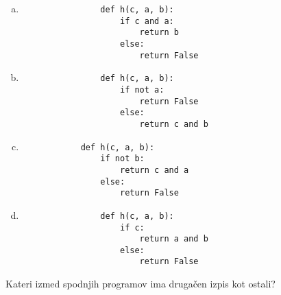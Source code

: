 \documentclass[arhiv, 10pt]{../izpit}
\begin{document}
        \begin{multicols}{2}
        \begin{enumerate}[(a)]
\item 
                \begin{verbatim}
                def h(c, a, b):
                    if c and a:
                        return b
                    else:
                        return False
                \end{verbatim}
            
\item 
                \begin{verbatim}
                def h(c, a, b):
                    if not a:
                        return False
                    else:
                        return c and b
                \end{verbatim}
            
\item 
            \begin{verbatim}
            def h(c, a, b):
                if not b:
                    return c and a
                else:
                    return False
            \end{verbatim}
        
\item 
                \begin{verbatim}
                def h(c, a, b):
                    if c:
                        return a and b
                    else:
                        return False
                \end{verbatim}
            
\end{enumerate}

        \end{multicols}
    
        \naloga*
        
        Kateri izmed spodnjih programov ima drugačen izpis kot ostali?
    
\end{document}
